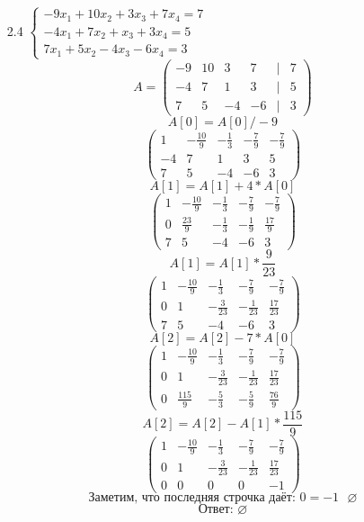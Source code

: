 \documentclass[a4paper]{article}
\renewcommand{\f}[2]{\frac{#1}{#2}}
\begin{document}
\begin{enumerate}
\begin{enumerate}
        \item[2.4]
        $\begin{cases}
            -9x_1 + 10x_2 + 3x_3 + 7x_4 = 7 \\
            -4x_1 + 7x_2 + x_3 + 3x_4 = 5 \\
            7x_1 + 5x_2 - 4x_3 - 6x_4 = 3
        \end{cases}$
        \[A= 
        \begin{pmatrix}
        -9 & 10 & 3 & 7 & | & 7 \\
        -4 & 7 & 1 & 3 & | & 5 \\
        7 & 5 & -4 & -6 & | & 3
        \end{pmatrix}
        \]
        \[A[0] = A[0]/-9\]
        \[
        \begin{pmatrix}
        1 & -\frac{10}{9} & -\frac{1}{3} & -\frac{7}{9} & -\frac{7}{9} \\
        -4 & 7 & 1 & 3 & 5 \\
        7 & 5 & -4 & -6 & 3
        \end{pmatrix}
        \]
        \[A[1] = A[1] + 4*A[0]\]
        \[
        \begin{pmatrix}
        1 & -\frac{10}{9} & -\frac{1}{3} & -\frac{7}{9} & -\frac{7}{9} \\
        0 & \frac{23}{9} & -\frac{1}{3} & -\frac{1}{9} & \frac{17}{9} \\
        7 & 5 & -4 & -6 & 3
        \end{pmatrix}
        \]
        \[A[1] = A[1]*\f{9}{23}\]
        \[
        \begin{pmatrix}
        1 & -\frac{10}{9} & -\frac{1}{3} & -\frac{7}{9} & -\frac{7}{9} \\
        0 & 1 & -\frac{3}{23} & -\frac{1}{23} & \frac{17}{23} \\
        7 & 5 & -4 & -6 & 3
        \end{pmatrix}
        \]
        \[A[2] = A[2]-7*A[0]\]
        \[
        \begin{pmatrix}
        1 & -\frac{10}{9} & -\frac{1}{3} & -\frac{7}{9} & -\frac{7}{9} \\
        0 & 1 & -\frac{3}{23} & -\frac{1}{23} & \frac{17}{23} \\
        0 & \frac{115}{9} & -\frac{5}{3} & -\frac{5}{9} & \frac{76}{9}
        \end{pmatrix}
        \]
        \[A[2] = A[2]-A[1]*\f{115}{9}\]
        \[
        \begin{pmatrix}
        1 & -\frac{10}{9} & -\frac{1}{3} & -\frac{7}{9} & -\frac{7}{9} \\
        0 & 1 & -\frac{3}{23} & -\frac{1}{23} & \frac{17}{23} \\
        0 & 0 & 0 & 0 & -1
        \end{pmatrix}
        \]
        \[\text{Заметим, что последняя строчка даёт: } 0 = -1 \text{  }\varnothing\]
        \[\textbf{Ответ: } \varnothing\]
    \end{enumerate}


\end{enumerate}
\end{document}
